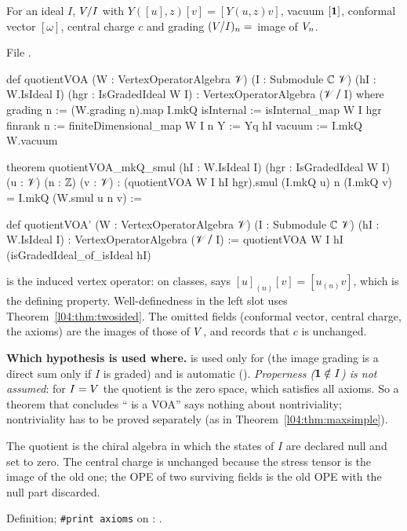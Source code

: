 \begin{definition}\label{l04:def:quot}
For an ideal $I$, $V/I$ with $Y([u],z)[v] = [Y(u,z)v]$, vacuum $[\mathbf{1}]$, conformal vector
$[\omega]$, central charge $c$ and grading $(V/I)_n = $ image of $V_n$.
\end{definition}
\noindent File .
\begin{leancode}
def quotientVOA (W : VertexOperatorAlgebra 𝒱) (I : Submodule ℂ 𝒱)
    (hI : W.IsIdeal I) (hgr : IsGradedIdeal W I) : VertexOperatorAlgebra (𝒱 ⧸ I) where
  grading n := (W.grading n).map I.mkQ
  isInternal := isInternal_map W I hgr
  finrank n := finiteDimensional_map W I n
  Y := Yq hI
  vacuum := I.mkQ W.vacuum

theorem quotientVOA_mkQ_smul (hI : W.IsIdeal I) (hgr : IsGradedIdeal W I)
    (u : 𝒱) (n : ℤ) (v : 𝒱) :
    (quotientVOA W I hI hgr).smul (I.mkQ u) n (I.mkQ v) = I.mkQ (W.smul u n v) :=

def quotientVOA' (W : VertexOperatorAlgebra 𝒱) (I : Submodule ℂ 𝒱) (hI : W.IsIdeal I) :
    VertexOperatorAlgebra (𝒱 ⧸ I) :=
  quotientVOA W I hI (isGradedIdeal_of_isIdeal hI)
\end{leancode}
\begin{dictionary}
 is the induced vertex operator: on classes, \allowbreak{}\allowbreak{} says
$[u]_{(n)}[v] = [u_{(n)}v]$, which is the defining property. Well-definedness in the left slot uses
Theorem~\ref{l04:thm:twosided}. The omitted fields (conformal vector, central charge, the axioms)
are the images of those of $V$, and \allowbreak{} records that $c$ is
unchanged.

\textbf{Which hypothesis is used where.}  is used only for  (the image
grading is a direct sum only if $I$ is graded) and is automatic ().
\emph{Properness ($\mathbf{1}\notin I$) is not assumed}: for $I = V$ the quotient is the zero
space, which satisfies all axioms. So a theorem that concludes `` is a VOA''
says nothing about nontriviality; nontriviality has to be proved separately (as in
Theorem~\ref{l04:thm:maxsimple}).
\end{dictionary}
\begin{physics}
The quotient is the chiral algebra in which the states of $I$ are declared null and set to zero.
The central charge is unchanged because the stress tensor is the image of the old one; the OPE of
two surviving fields is the old OPE with the null part discarded.
\end{physics}
\begin{status}
Definition; \texttt{\#print axioms} on : .
\end{status}

